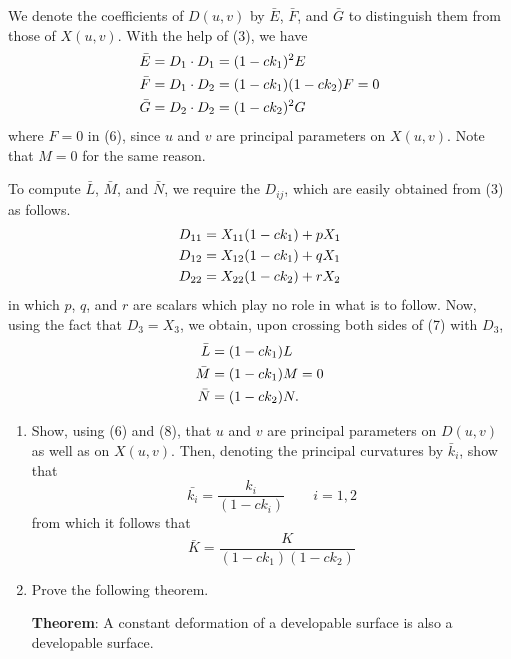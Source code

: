 \documentclass{book}
\begin{document}
We denote the coefficients of $D(u,v)$ by $\bar{E}$, $\bar{F}$, and $\bar{G}$ to distinguish them from those of $X(u,v)$. With the help of (3), we have
\begin{align}
\bar{E} & = D_{1} \cdot D_{1} = (1 - ck_{1})^{2} E \notag \\
\bar{F} & = D_{1} \cdot D_{2} = (1 - ck_{1}) (1 - ck_{2}) F = 0 \\
\bar{G} & = D_{2} \cdot D_{2} = (1 - ck_{2})^{2} G \notag
\end{align}
where $F = 0$ in (6), since $u$ and $v$ are principal parameters on $X(u,v)$. Note that $M = 0$ for the same reason.

To compute $\bar{L}$, $\bar{M}$, and $\bar{N}$, we require the $D_{ij}$, which are easily obtained from (3) as follows.
\begin{align}
D_{11} & = X_{11} (1 - ck_{1}) + pX_{1} \notag \\
D_{12} & = X_{12} (1 - ck_{1}) + qX_{1} \\
D_{22} & = X_{22} (1 - ck_{2}) + rX_{2} \notag
\end{align}
in which $p$, $q$, and $r$ are scalars which play no role in what is to follow. Now, using the fact that $D_{3} = X_{3}$, we obtain, upon crossing both sides of (7) with $D_{3}$,
\begin{align}
\bar{L} & = (1 - ck_{1}) L \notag \\
\bar{M} & = (1 - ck_{1}) M = 0 \\
\bar{N} & = (1 - ck_{2}) N. \notag
\end{align}

\begin{enumerate}
  \item[4.] Show, using (6) and (8), that $u$ and $v$ are principal parameters on $D(u,v)$ as well as on $X(u,v)$. Then, denoting the principal curvatures by $\bar k_{i}$, show that
    \begin{equation}
      \bar{k_{i}} = \frac{ k_{i} }{ (1 - ck_{i}) } \quad \quad i = 1,2
    \end{equation}
    from which it follows that
    \begin{equation}
      \bar{K} = \frac{K}{ (1 - ck_{1}) (1 - ck_{2}) }
    \end{equation}
  \item[5.] Prove the following theorem.

     \textbf{Theorem}: A constant deformation of a developable surface is also a developable surface.
\end{enumerate}
\end{document}
